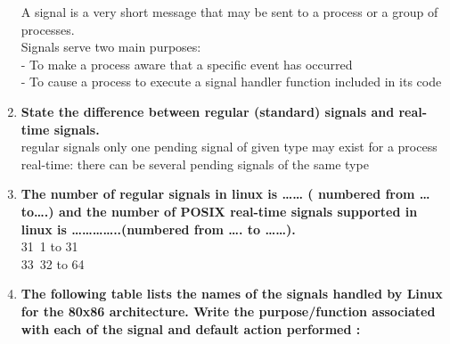 \documentclass[a4paper,12pt]{article}
\begin{document}
\begin{flushleft}
\begin{enumerate}
{\color{red}A signal is a very short message that may be sent to a process or a group of processes.\\
Signals serve two main purposes:\\
- To make a process aware that a specific event has occurred\\
- To cause a process to execute a signal handler function included in its code
}\\
\item \textbf{ State the difference between regular (standard) signals and real-time signals.}\\
{\color{red}regular signals only one pending signal of given type may exist for a process\\
real-time: there can be several pending signals of the same type}\\
\item \textbf{ The number of regular signals in linux is …… ( numbered from … to….) and the number of POSIX real-time signals supported in linux is …………..(numbered from …. to ……).}\\
{\color{red}31\ 1 to 31\\33\ 32 to 64}\\
\item \textbf{ The following table lists the names of the signals handled by Linux for the 80x86 architecture. Write the purpose/function associated with each of the signal and default action performed :}\\



\end{enumerate}
\end{flushleft}
\end{document}
